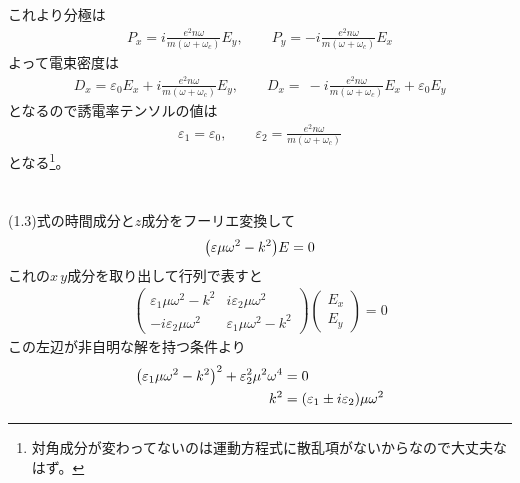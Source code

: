 \documentclass[../../master.tex]{subfiles}
\begin{document}
これより分極は
\begin{align}
    P_x = i\frac{e^2n\omega}{m(\omega+\omega_c)}E_{y},\qquad
    P_y = -i\frac{e^2n\omega}{m(\omega+\omega_c)}E_{x}
\end{align}
よって電束密度は
\begin{align}
    D_x = \varepsilon_0 E_x + i\frac{e^2n\omega}{m(\omega+\omega_c)}E_y,\qquad
    D_x = \ -i\frac{e^2n\omega}{m(\omega+\omega_c)}E_x + \varepsilon_0 E_y
\end{align}
となるので誘電率テンソルの値は
\begin{align}
    \varepsilon_1 = \varepsilon_0,\qquad \varepsilon_2 = \frac{e^2n\omega}{m(\omega+\omega_c)}
\end{align}
となる\footnote{対角成分が変わってないのは運動方程式に散乱項がないからなので大丈夫なはず。}。

\section{}
\subsection{}
(1.3)式の時間成分と\(z\)成分をフーリエ変換して
\begin{align}
    \qty(\varepsilon\mu\omega^2 -k^2)E = 0
\end{align}
これの\(x\,y\)成分を取り出して行列で表すと
\begin{align}
    \begin{pmatrix}
        \varepsilon_1\mu\omega^2-k^2 & i\varepsilon_2\mu\omega^2\\
        -i\varepsilon_2\mu\omega^2 & \varepsilon_1\mu\omega^2-k^2
    \end{pmatrix}\begin{pmatrix}
        E_x\\E_y
    \end{pmatrix}=0
\end{align}
この左辺が非自明な解を持つ条件より
\begin{align}
    \qty(\varepsilon_1\mu\omega^2-k^2)^2+\varepsilon_2^2\mu^2\omega^4 &= 0\\
    k^2&=(\varepsilon_1\pm i \varepsilon_2)\mu\omega^2
\end{align}
\end{document}
